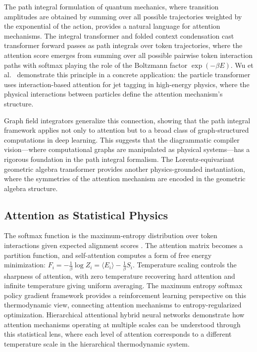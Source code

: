 \documentclass[12pt,a4paper]{article}
\begin{document}
The path integral formulation of quantum mechanics, where transition amplitudes are obtained by summing over all possible trajectories weighted by the exponential of the action, provides a natural language for attention mechanisms. The integral transformer \cite{integral2025integral} and folded context condensation \cite{paeng2025folded} cast transformer forward passes as path integrals over token trajectories, where the attention score emerges from summing over all possible pairwise token interaction paths with softmax playing the role of the Boltzmann factor $\exp(-\beta E)$. Wu et al.~\cite{wu2024jet} demonstrate this principle in a concrete application: the particle transformer uses interaction-based attention for jet tagging in high-energy physics, where the physical interactions between particles define the attention mechanism's structure.

Graph field integrators \cite{choromanski2026graph} generalize this connection, showing that the path integral framework applies not only to attention but to a broad class of graph-structured computations in deep learning. This suggests that the diagrammatic compiler vision---where computational graphs are manipulated as physical systems---has a rigorous foundation in the path integral formalism. The Lorentz-equivariant geometric algebra transformer \cite{brehmer2024a} provides another physics-grounded instantiation, where the symmetries of the attention mechanism are encoded in the geometric algebra structure.

\subsection{Attention as Statistical Physics}

The softmax function is the maximum-entropy distribution over token interactions given expected alignment scores \cite{granziol2019meme}. The attention matrix becomes a partition function, and self-attention computes a form of free energy minimization: $F_i = -\frac{1}{\beta} \log Z_i = \langle E_i \rangle - \frac{1}{\beta} S_i$. Temperature scaling controls the sharpness of attention, with zero temperature recovering hard attention and infinite temperature giving uniform averaging. The maximum entropy softmax policy gradient framework \cite{choe2025maximum} provides a reinforcement learning perspective on this thermodynamic view, connecting attention mechanisms to entropy-regularized optimization. Hierarchical attentional hybrid neural networks \cite{abreu2019hierarchical} demonstrate how attention mechanisms operating at multiple scales can be understood through this statistical lens, where each level of attention corresponds to a different temperature scale in the hierarchical thermodynamic system.
\end{document}

